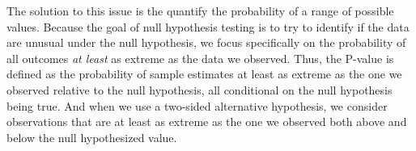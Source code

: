 \documentclass[
]{book}
\newenvironment{Shaded}{\begin{snugshade}}{\end{snugshade}}
\newcommand{\AttributeTok}[1]{\textcolor[rgb]{0.13,0.29,0.53}{#1}}
\newcommand{\CommentTok}[1]{\textcolor[rgb]{0.56,0.35,0.01}{\textit{#1}}}
\newcommand{\ConstantTok}[1]{\textcolor[rgb]{0.56,0.35,0.01}{#1}}
\newcommand{\DecValTok}[1]{\textcolor[rgb]{0.00,0.00,0.81}{#1}}
\newcommand{\FloatTok}[1]{\textcolor[rgb]{0.00,0.00,0.81}{#1}}
\newcommand{\FunctionTok}[1]{\textcolor[rgb]{0.13,0.29,0.53}{\textbf{#1}}}
\newcommand{\NormalTok}[1]{#1}
\newcommand{\OtherTok}[1]{\textcolor[rgb]{0.56,0.35,0.01}{#1}}
\newcommand{\SpecialCharTok}[1]{\textcolor[rgb]{0.81,0.36,0.00}{\textbf{#1}}}
\newcommand{\StringTok}[1]{\textcolor[rgb]{0.31,0.60,0.02}{#1}}
\begin{document}
The solution to this issue is the quantify the probability of a range of possible values. Because the goal of null hypothesis testing is to try to identify if the data are unusual under the null hypothesis, we focus specifically on the probability of all outcomes \emph{at least} as extreme as the data we observed. Thus, the P-value is defined as the probability of sample estimates at least as extreme as the one we observed relative to the null hypothesis, all conditional on the null hypothesis being true. And when we use a two-sided alternative hypothesis, we consider observations that are at least as extreme as the one we observed both above and below the null hypothesized value.

\begin{Shaded}
\end{Shaded}
\end{document}
